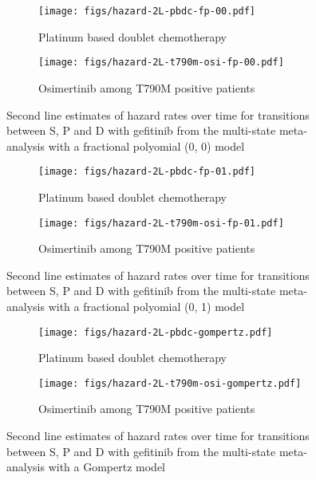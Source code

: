 \documentclass[11pt,final,fleqn]{article}\usepackage[]{graphicx}\usepackage[]{color}
\theoremstyle{plain}
\begin{document}
\begin{appendices}
\begin{figure}
\centering
\begin{subfigure}{\textwidth}
\centering
\texttt{[image: figs/hazard-2L-pbdc-fp-00.pdf]}
\caption{Platinum based doublet chemotherapy} \label{subfig:hazard-2L-pbdc-fp-00}
\end{subfigure}
\begin{subfigure}{\textwidth}
\centering
\texttt{[image: figs/hazard-2L-t790m-osi-fp-00.pdf]}
\caption{Osimertinib among T790M positive patients} \label{subfig:hazard-2L-t790m-osi-fp-00}
\end{subfigure}
\caption{Second line estimates of hazard rates over time for transitions between S, P and D with gefitinib from the multi-state meta-analysis with a fractional polyomial (0, 0) model}\label{fig:hazard-2L-fp-00}
\end{figure}

\begin{figure}
\centering
\begin{subfigure}{\textwidth}
\centering
\texttt{[image: figs/hazard-2L-pbdc-fp-01.pdf]}
\caption{Platinum based doublet chemotherapy} \label{subfig:hazard-2L-pbdc-fp-01}
\end{subfigure}
\begin{subfigure}{\textwidth}
\centering
\texttt{[image: figs/hazard-2L-t790m-osi-fp-01.pdf]}
\caption{Osimertinib among T790M positive patients} \label{subfig:hazard-2L-t790m-osi-fp-01}
\end{subfigure}
\caption{Second line estimates of hazard rates over time for transitions between S, P and D with gefitinib from the multi-state meta-analysis with a fractional polyomial (0, 1) model}\label{fig:hazard-2L-fp-01}
\end{figure}

\begin{figure}
\centering
\begin{subfigure}{\textwidth}
\centering
\texttt{[image: figs/hazard-2L-pbdc-gompertz.pdf]}
\caption{Platinum based doublet chemotherapy} \label{subfig:hazard-2L-pbdc-gompertz}
\end{subfigure}
\begin{subfigure}{\textwidth}
\centering
\texttt{[image: figs/hazard-2L-t790m-osi-gompertz.pdf]}
\caption{Osimertinib among T790M positive patients} \label{subfig:hazard-2L-t790m-osi-gompertz}
\end{subfigure}
\caption{Second line estimates of hazard rates over time for transitions between S, P and D with gefitinib from the multi-state meta-analysis with a Gompertz model}\label{fig:hazard-2L-gompertz}
\end{figure}


\end{appendices}
\end{document}

